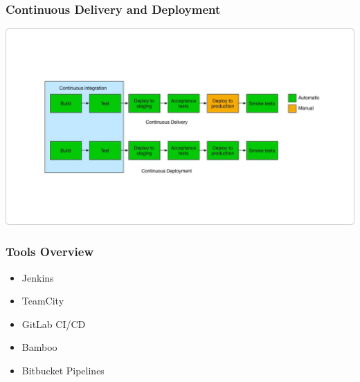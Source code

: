 \begin{frame}
\frametitle{Continuous Delivery and Deployment}
\includegraphics[width=\textwidth, height=0.56\textwidth]{cont-delivery-deployment.png}
\end{frame}

\begin{frame}
\frametitle{Tools Overview}
\begin{itemize}
	\item Jenkins
	\item TeamCity
	\item GitLab CI/CD
	\item Bamboo
	\item Bitbucket Pipelines
\end{itemize}
\end{frame}
